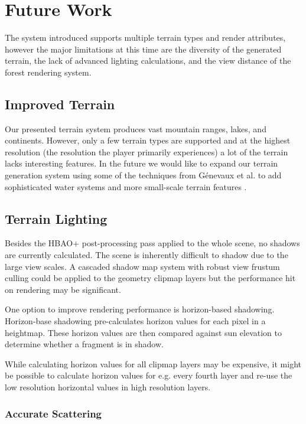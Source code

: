 
\chapter{Future Work} \label{futurework}

The system introduced supports multiple terrain types and render attributes, however the major limitations at this time are the diversity of the generated terrain, the lack of advanced lighting calculations, and the view distance of the forest rendering system.

\section{Improved Terrain}

Our presented terrain system produces vast mountain ranges, lakes, and continents.
However, only a few terrain types are supported and at the highest resolution (the resolution the player primarily experiences) a lot of the terrain lacks interesting features.
In the future we would like to expand our terrain generation system using some of the techniques from G{\'e}nevaux et al. to add sophisticated water systems and more small-scale terrain features \cite{hydrology}.

\section{Terrain Lighting}

Besides the HBAO+ post-processing pass applied to the whole scene, no shadows are currently calculated.
The scene is inherently difficult to shadow due to the large view scales.
A cascaded shadow map system with robust view frustum culling could be applied to the geometry clipmap layers but the performance hit on rendering may be significant.

One option to improve rendering performance is horizon-based shadowing.
Horizon-base shadowing pre-calculates horizon values for each pixel in a heightmap.
These horizon values are then compared against sun elevation to determine whether a fragment is in shadow.

While calculating horizon values for all clipmap layers may be expensive, it might be possible to calculate horizon values for e.g. every fourth layer and re-use the low resolution horizontal values in high resolution layers.


\subsection{Accurate Scattering}

